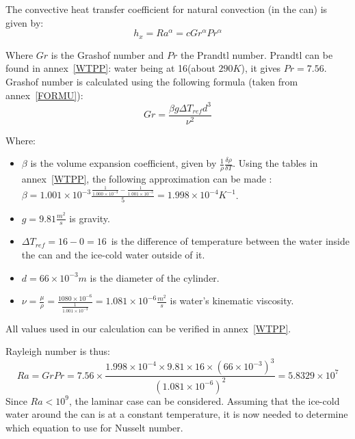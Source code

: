 \documentclass{report}
\begin{document}
	The convective heat transfer coefficient for natural convection (in the can) is given by:
	\begin{equation}
		h_x=Ra^\alpha = cGr^\alpha Pr^\alpha
	\end{equation}
	
	Where $Gr$ is the Grashof number and $Pr$ the Prandtl number. Prandtl can be found in annex~\ref{WTPP}: water being at 16\textcelsius (about $290K$), it gives $Pr=7.56$.\\
	Grashof number is calculated using the following formula (taken from annex~\ref{FORMU}):
	\begin{equation}
		Gr=\frac{\beta g \Delta T_{ref} d^3}{\nu^2}
	\end{equation}
	
	Where:
	\begin{itemize}
		\item $\beta$ is the volume expansion coefficient, given by $\frac{1}{\rho}\frac{\delta\rho}{\delta T}$. Using the tables in annex~\ref{WTPP}, the following approximation can be made : $\beta=1.001\times 10^{-3}\frac{\frac{1}{1.000\times 10^{-3}}-\frac{1}{1.001\times 10^{-3}}}{5}=1.998\times 10^{-4} K^{-1}$.
		\item $g=9.81\frac{m^2}{s}$ is gravity.
		\item $\Delta T_{ref}=16-0=16$\textcelsius\ is the difference of temperature between the water inside the can and the ice-cold water outside of it.
		\item $d=66\times 10^{-3}m$ is the diameter of the cylinder.
		\item $\nu=\frac{\mu}{\rho}=\frac{1080\times 10^{-6}}{\frac{1}{1.001\times 10^{-3}}}=1.081\times 10^{-6}\frac{m^2}{s}$ is water's kinematic viscosity.
	\end{itemize}
	All values used in our calculation can be verified in annex~\ref{WTPP}.
	
	
	Rayleigh number is thus: 
	\begin{equation}
		Ra = GrPr= 7.56\times \frac{1.998\times 10^{-4}\times 9.81\times 16\times (66\times 10^{-3})^3}{(1.081\times 10^{-6})^2}= 5.8329\times 10^{7}
	\end{equation}
	Since $Ra<10^9$, the laminar case can be considered. Assuming that the ice-cold water around the can is at a constant temperature, it is now needed to determine which equation to use for Nusselt number.
	
\end{document}
